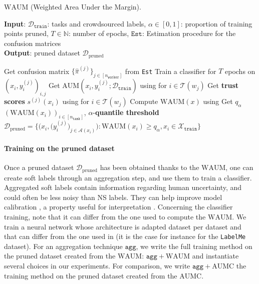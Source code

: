\begin{algorithm}[tb]
\caption{$\mathrm{WAUM}$ (Weighted Area Under the Margin).}
\label{alg:WAUMstack}
\textbf{Input}:  $\mathcal{D}_{\texttt{train}}$: tasks and crowdsourced labels, $\alpha\in[0,1]$: proportion of training points pruned, $T\in \mathbb{N}$: number of epochs, $\texttt{Est}$: Estimation procedure for the confusion matrices\\
\textbf{Output}: pruned dataset $\mathcal{D}_{\text{pruned}}$
\begin{algorithmic}[1]
\STATE Get confusion matrix $\{\hat{\pi}^{(j)}\}_{j\in[n_\texttt{worker}]}$ from \texttt{Est}
\STATE Train a classifier for $T$ epochs on $\left(x_i, y_i^{(j)}\right)_{i,j}$
\STATE Get $\mathrm{AUM}(x_i, y_i^{(j)}; \mathcal{D}_{\texttt{train}})$ using  for $i\in\mathcal{T}(w_j)$
\STATE Get \textbf{trust scores} $s^{(j)}(x_i)$ using  for $i\in\mathcal{T}(w_j)$
\ENDFOR
{}
\STATE Compute $\mathrm{WAUM}(x)$ using \;
\ENDFOR
\STATE  Get $q_{\alpha}$ $(\mathrm{WAUM}(x_i))_{i\in[n_\texttt{task}]}$, $\alpha$-\textbf{quantile threshold}
\STATE $\mathcal{D}_{\text{pruned}}\!=\!
        \Big\{
        \big( x_i, \big(y_i^{(j)}\big)_{j\in\mathcal{A}(x_i)}\big) \! : \!\mathrm{WAUM}(x_i) \geq q_\alpha,  x_i \in \mathcal{X}_\texttt{train}  \Big
        \}$
\end{algorithmic}
\end{algorithm}

\paragraph{Training on the pruned dataset}
Once a pruned dataset $\mathcal{D}_{\text{pruned}}$ has been obtained thanks to the $\mathrm{WAUM}$, one can create soft labels through an aggregation step, and use them to train a classifier.
Aggregated soft labels contain information regarding human uncertainty, and could often be less noisy than NS labels.
They can help improve model calibration \citep{wen2020combining, zhong2021improving}, a property useful for interpretation \citep{jiang2012calibrating, kumar2019verified}.
Concerning the classifier training, note that it can differ from the one used to compute the $\mathrm{WAUM}$.
We train a neural network whose architecture is adapted dataset per dataset and that can differ from the one used in  (it is the case for instance for the \texttt{LabelMe} dataset).
For an aggregation technique $\texttt{agg}$, we write the full training method on the pruned dataset created from the $\mathrm{WAUM}$: $\texttt{agg}+\mathrm{WAUM}$ and instantiate several choices in our experiments.
For comparison, we write $\texttt{agg} + \mathrm{AUMC}$ the training method on the pruned dataset created from the $\mathrm{AUMC}$.

